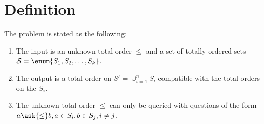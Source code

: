\section{Definition}
\label{tree:merging:def}

The problem is stated as the following:

\begin{enumerate}
\item The input is an unknown total order $\le$ and a set of totally ordered
sets ${\cal S} = \enum{S_1, S_2, \ldots, S_k}$.
\item The output is a total order on $S' = \cup_{i=1}^{n} S_i$ compatible with
the total orders on the $S_i$.
\item The unknown total order $\le$ can only be queried with questions of the
form $a \ask{\le} b, a \in S_i, b \in S_j, i \neq j$.
\end{enumerate}

